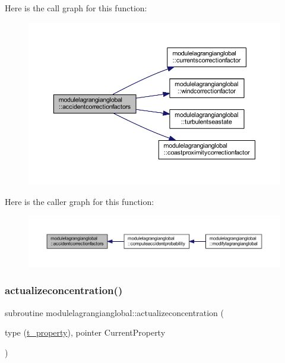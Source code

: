 Here is the call graph for this function\+:\nopagebreak
\begin{figure}[H]
\begin{center}
\leavevmode
\includegraphics[width=350pt]{namespacemodulelagrangianglobal_afb914f24bcc861691825610d67c3f53d_cgraph}
\end{center}
\end{figure}
Here is the caller graph for this function\+:\nopagebreak
\begin{figure}[H]
\begin{center}
\leavevmode
\includegraphics[width=350pt]{namespacemodulelagrangianglobal_afb914f24bcc861691825610d67c3f53d_icgraph}
\end{center}
\end{figure}
\mbox{\label{namespacemodulelagrangianglobal_a9011e7719eb353ee72ecbd6bce3e7ac1}} 
\subsubsection{\texorpdfstring{actualizeconcentration()}{actualizeconcentration()}}
{\footnotesize\ttfamily subroutine modulelagrangianglobal\+::actualizeconcentration (\begin{DoxyParamCaption}\item[{type (\mbox{\hyperlink{structmodulelagrangianglobal_1_1t__property}{t\+\_\+property}}), pointer}]{Current\+Property }\end{DoxyParamCaption})\hspace{0.3cm}{\ttfamily [private]}}

